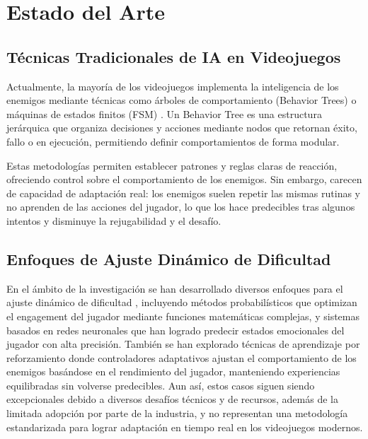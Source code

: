 \documentclass[informe]{upropuesta}
\begin{document}
\section{Estado del Arte}\label{sec:sa}

\subsection{Técnicas Tradicionales de IA en Videojuegos}

Actualmente, la mayoría de los videojuegos implementa la inteligencia de los enemigos mediante técnicas como árboles de comportamiento (Behavior Trees) o máquinas de estados finitos (FSM) \cite{IOVINO2022104096}. Un Behavior Tree es una estructura jerárquica que organiza decisiones y acciones mediante nodos que retornan éxito, fallo o en ejecución, permitiendo definir comportamientos de forma modular.

Estas metodologías permiten establecer patrones y reglas claras de reacción, ofreciendo control sobre el comportamiento de los enemigos. Sin embargo, carecen de capacidad de adaptación real: los enemigos suelen repetir las mismas rutinas y no aprenden de las acciones del jugador, lo que los hace predecibles tras algunos intentos y disminuye la rejugabilidad y el desafío.
\subsection{Enfoques de Ajuste Dinámico de Dificultad}

En el ámbito de la investigación se han desarrollado diversos enfoques para el ajuste dinámico de dificultad \cite{Zohaib18}, incluyendo métodos probabilísticos que optimizan el engagement del jugador mediante funciones matemáticas complejas, y sistemas basados en redes neuronales que han logrado predecir estados emocionales del jugador con alta precisión. También se han explorado técnicas de aprendizaje por reforzamiento donde controladores adaptativos ajustan el comportamiento de los enemigos basándose en el rendimiento del jugador, manteniendo experiencias equilibradas sin volverse predecibles. Aun así, estos casos siguen siendo excepcionales debido a diversos desafíos técnicos y de recursos, además de la limitada adopción por parte de la industria, y no representan una metodología estandarizada para lograr adaptación en tiempo real en los videojuegos modernos.
\end{document}
